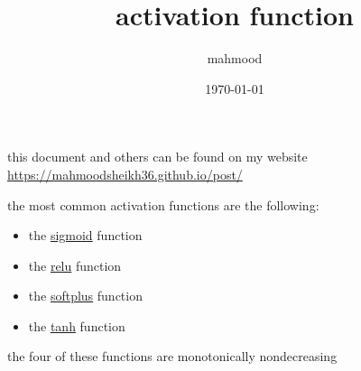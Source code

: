 \documentclass[a4paper,12pt]{article}
\author{mahmood}
\date{\today}
\title{activation function}
\begin{document}
\maketitle
\begin{note}
this document and others can be found on my website\\
\url{https://mahmoodsheikh36.github.io/post/}
\end{note}
the most common activation functions are the following:\\
\begin{itemize}
\item the \href{20230503001218-sigmoid.org}{sigmoid} function\\
\item the \href{20230503001319-relu.org}{relu} function\\
\item the \href{20230503001408-softplus.org}{softplus} function\\
\item the \href{20230503001513-tanh.org}{tanh} function\\
\end{itemize}
the four of these functions are monotonically nondecreasing
\end{document}
